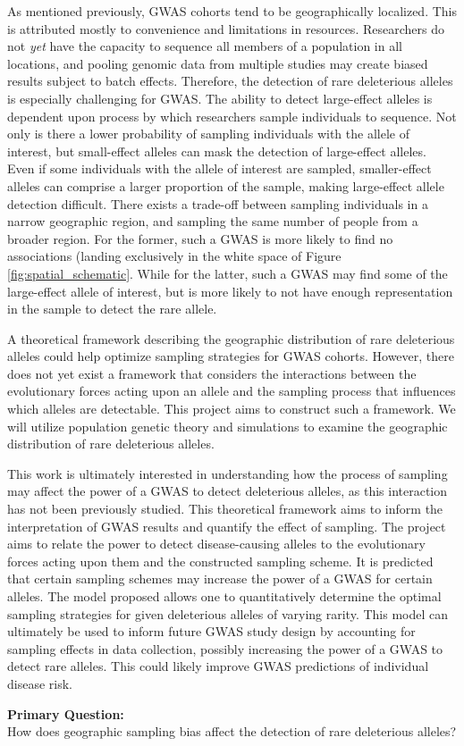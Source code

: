 As mentioned previously, GWAS cohorts tend to be geographically localized. This is attributed mostly to convenience and limitations in resources. Researchers do not \textit{yet} have the capacity to sequence all members of a population in all locations, and pooling genomic data from multiple studies may create biased results subject to batch effects. \cite{woolston_2015}\cite{gilad_2015} Therefore, the detection of rare deleterious alleles is especially challenging for GWAS. The ability to detect large-effect alleles is dependent upon process by which researchers sample individuals to sequence. Not only is there a lower probability of sampling individuals with the allele of interest, but small-effect alleles can mask the detection of large-effect alleles. Even if some individuals with the allele of interest are sampled, smaller-effect alleles can comprise a larger proportion of the sample, making large-effect allele detection difficult. There exists a trade-off between sampling individuals in a narrow geographic region, and sampling the same number of people from a broader region. For the former, such a GWAS is more likely to find no associations (landing exclusively in the white space of Figure \ref{fig:spatial_schematic}. While for the latter, such a GWAS may find some of the large-effect allele of interest, but is more likely to not have enough representation in the sample to detect the rare allele. 


A theoretical framework describing the geographic distribution of rare deleterious alleles could help optimize sampling strategies for GWAS cohorts. However, there does not yet exist a framework that considers the interactions between the evolutionary forces acting upon an allele and the sampling process that influences which alleles are detectable. This project aims to construct such a framework. We will utilize population genetic theory and simulations to examine the geographic distribution of rare deleterious alleles. 


This work is ultimately interested in understanding how the process of sampling may affect the power of a GWAS to detect deleterious alleles, as this interaction has not been previously studied. This theoretical framework aims to inform the interpretation of GWAS results and quantify the effect of sampling. The project aims to relate the power to detect disease-causing alleles to the evolutionary forces acting upon them and the constructed sampling scheme. It is predicted that certain sampling schemes may increase the power of a GWAS for certain alleles. The model proposed allows one to quantitatively determine the optimal sampling strategies for given deleterious alleles of varying rarity. This model can ultimately be used to inform future GWAS study design by accounting for sampling effects in data collection, possibly increasing the power of a GWAS to detect rare alleles. This could likely improve GWAS predictions of individual disease risk.


\begin{center}
    \textbf{Primary Question:} \\
    How  does geographic sampling bias affect the detection of rare deleterious alleles?
\end{center}